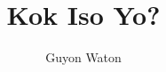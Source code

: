\documentclass{report}
\begin{document}
\title{Kok Iso Yo?}
\author{Guyon Waton}
\maketitle
\end{document}
